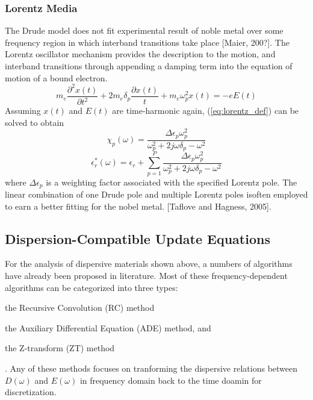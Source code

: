 \subsubsection{Lorentz Media}
The Drude model does not fit experimental result of noble metal over some frequency region in which interband
transitions take place [Maier, 200?]. The Lorentz oscillator mechanism provides the description to the motion, and
interband transitions through appending a damping term into the equation of motion of a bound electron.
\begin{equation}\label{eq:lorentz_def}
    m_e\frac{\partial^2 x(t)}{\partial t^2} + 2m_e\delta_p\frac{\partial x(t)}{t} + m_e\omega_p^2x(t) = -eE(t)
\end{equation}
Assuming $x(t)$ and $E(t)$ are time-harmonic again, (\ref{eq:lorentz_def}) can be solved to obtain
\begin{equation}
  \label{eq:lorentz_chi}
  \chi_p(\omega) = \frac{\Delta\epsilon_p\omega_p^2}{\omega_p^2 + 2j\omega\delta_p - \omega^2}  
\end{equation}
\begin{equation}
  \epsilon_r^*(\omega) = \epsilon_r + \sum_{p=1}^P \frac{\Delta\epsilon_p\omega_p^2}{\omega_p^2 + 2j\omega\delta_p - \omega^2}  
\end{equation}
where $\Delta\epsilon_p$ is a weighting factor associated with the specified Lorentz pole. The linear combination of one
Drude pole and multiple Lorentz poles isoften employed to earn a better fitting for the nobel metal. [Taflove and
  Hagness, 2005].



\subsection{Dispersion-Compatible Update Equations}
For the analysis of dispersive materials shown above, a numbers of algorithms have already been proposed in literature.
Most of these frequency-dependent algorithms can be categorized into three types: \begin{inparaenum}[(1)]
\item the Recursive Convolution (RC) method
\item the Auxiliary Differential Equation (ADE) method, and
\item the Z-transform (ZT) method\end{inparaenum}.
Any of these methods focuses on tranforming the dispersive relations between $D(\omega)$ and $E(\omega)$ in frequency
domain back to the time doamin for discretization.


